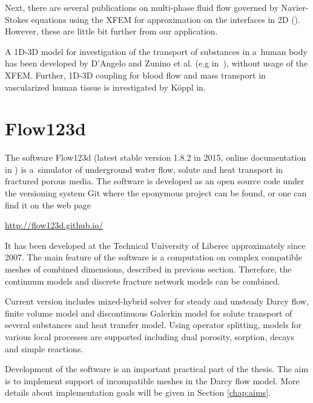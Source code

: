 \documentclass[FM,Dis]{tulthesis}
\begin{document}
Next, there are several publications on multi-phase fluid flow governed by Navier-Stokes equations using the XFEM for
approximation on the interfaces in 2D (\cite{diez_stable_2013,sauerland_stable_2013}). However, these are
little bit further from our application.

A 1D-3D model for investigation of the transport of substances in a~human body has been developed by D'Angelo 
and Zunino et al. (e.g in~\cite{dangelo_coupling_2008,cattaneo_numerical_2015}), without usage of the XFEM.
Further, 1D-3D coupling for blood flow and mass transport in vascularized human tissue is
investigated by K{\" o}ppl in\cite{koppl_tum_2015}.


\section{Flow123d} \label{sec:soa_flow123d}
The software Flow123d (latest stable version 1.8.2 in 2015, online documentation in \cite{flow123d_doc_2015}) 
is a~simulator of underground water flow, solute and heat transport in fractured porous media. The software is
developed as an open source code under the versioning system Git where the eponymous project can be found, or 
one can find it on the web page
\begin{center}
\url{http://flow123d.github.io/}
\end{center}
It has been developed at the Technical University of Liberec approximately since 2007.
The main feature of the software is a computation on complex compatible meshes of combined dimensions, described in
previous section. Therefore, the continuum models and discrete fracture network models can be combined.

Current version includes mixed-hybrid solver for steady and unsteady Darcy flow, finite volume model 
and discontinuous Galerkin model for solute transport of several substances and heat transfer model. 
Using operator splitting, models for various local processes are supported including dual porosity, sorption, decays 
and simple reactions.


Development of the software is an important practical part of the thesis. The aim is to implement support 
of incompatible meshes in the Darcy flow model. More details about implementation goals will be given in
Section \ref{chap:aims}.



\end{document}
